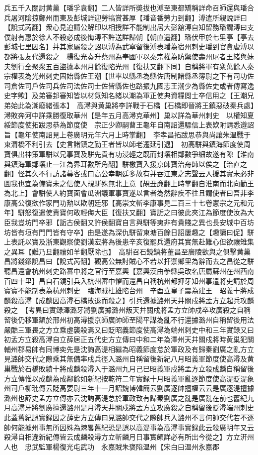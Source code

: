 兵五千入關討黄巢【璠孚袁翻】二人皆詳所奬拔也溥至東都矯稱詳命召師還與璠合兵屠河隂掠鄭州而東及彭城詳迎勞犒賞甚厚【璠音番勞力到翻】溥遣所親說詳曰【說式芮翻】衆心見迫請公解印以相授詳不能制出居大彭舘溥自知留務璠謂溥曰支僕射有惠於徐人不殺必成後悔溥不許送詳歸朝【朝直遥翻】璠伏甲於七里亭【亭去彭城七里因名】并其家屬殺之詔以溥為武寧留後溥表璠為宿州刺史璠到官貪虐溥以都將張友代還殺之　楊復光奏升蔡州為奉國軍以秦宗權為防禦使壽州屠者王緒與妹夫劉行全聚衆五百盜據本州月餘復陷光州【復扶又翻下同】自稱將軍有衆萬餘人秦宗權表為光州刺史固始縣佐王潮【世率以縣丞為縣佐唐制諸縣丞簿尉之下有司功佐司倉佐司戶佐司兵佐司法佐司士佐皆縣佐也路振九國志王潮少為縣佐史或者傳寫逸史字歟】及弟審邽審知皆以材氣知名緒以潮為軍正使典資糧閲士卒信用之【王潮兄弟始此為潮廢緒張本】　高潯與黄巢將李詳戰于石橋【石橋即晉將王鎮惡破秦兵處】潯敗奔河中詳乘勝復取華州【是年五月高潯克華州】巢以詳為華州刺史　以權知夏綏節度使拓跋思恭為節度使　宗正少卿嗣曹王龜年自南詔還驃信上表欵附請悉遵詔旨【龜年使南詔見上卷廣明元年六月上時掌翻】　李孝昌拓跋思恭與尚讓朱温戰于東渭橋不利引去【史言諸鎮之勤王者皆以師老遷延引退】　初高駢與鎮海節度使周寶俱出神策軍駢以兄事寶及駢先貴有功浸輕之既而封壤相鄰數爭細故遂有隙【淮南與鎮海軍鄰壤止一江為界耳數所角翻】駢檄寶入援京師寶治舟師以俟之【治直之翻】怪其久不行訪諸幕客或曰高公幸朝廷多故有并吞江東之志聲云入援其實未必非圖我也宜為備寶未之信使人覘駢殊無北上意【覘丑亷翻上時掌翻自淮南而北向勤王為北上】會駢使人約寶面會瓜洲議軍事寶遂以言者為然辭疾不往且謂使者曰吾非李康高公復欲作家門功勲以欺朝廷邪【高崇文斬李康事見二百三十七卷憲宗之元和元年】駢怒復遣使責寶何敢輕侮大臣【復扶又翻】寶詬之曰彼此夾江為節度使汝為大臣我豈坊門卒邪【詬古侯翻又許侯翻寶自言與駢等夷非有貴賤之異也長安城中百坊坊皆有垣有門門皆有守卒】由是遂為深仇駢留東塘百餘日詔屢趣之【趣讀曰促】駢上表託以寶及浙東觀察使劉漢宏將為後患辛亥復罷兵還府其實無赴難心但欲禳雉集之異耳【難乃旦翻禳如羊翻厭除也】　高駢召石鏡鎮將董昌至廣陵欲與之俱擊黄巢昌將錢鏐說昌曰【說式芮翻】觀高公無討賊心不若以扞禦鄉里為辭而去之昌從之駢聽昌還會杭州刺史路審中將之官行至嘉興【嘉興漢由拳縣吳改名唐屬蘇州在州西南百四十里】昌自石鏡引兵入杭州審中懼而還昌自稱杭州都押牙知州事遣將吏請於周寶寶不能制表為杭州刺史　臨海賊杜雄陷台州　辛酉立皇子震為建王　昭義十將成麟殺高潯【成麟因高潯石橋敗退而殺之】引兵還據潞州天井關戍將孟方立起兵攻麟殺之　【考異曰實録澤潞牙將劉廣據潞州叛天井關戍將孟方立帥戍卒攻廣殺之自稱留後仍移軍額於邢州初高潯援京師廣帥師至陽平謀為亂不行還據潞州自稱留後用法嚴酷三軍畏之方立乘虛襲殺焉又曰貶昭義節度使高潯為端州刺史中和三年實録又曰初孟方立殺高潯自立薛居正五代史方立傳曰中和二年為澤州天井關戍將時黄巢犯關輔州郡易帥有同博奕先是沈詢高湜相繼為昭義節度怠於軍政及有歸秦劉廣之亂方立見潞帥交代之際乘其無備率戍兵徑入潞州自稱留後新紀八月昭義軍節度使高潯及黄巢戰於石橋敗績十將成麟殺潯入于潞州九月己巳昭義軍戍將孟方立殺成麟自稱留後方立傳惟以成麟為成鄰餘如新紀按乾符二年實録十月昭義軍亂逐節度使高湜貶湜象州司戶柳玭傳云貶高要尉三年十一月詔魏博韓簡云劉廣逐帥擅權云云是廣逐湜擅據潞州也薛史孟方立傳亦云沈詢高湜怠於軍政致有歸秦劉廣之亂是廣亂在前也舊紀九月高潯牙將劉廣擅還潞州是月潯天井關戍將孟方立攻廣殺之自稱留後貶潯端州刺史此蓋舊紀誤實録因之薛史方立傳曰見潞帥交代之際帥兵入潞州不言何帥交代若不逐帥何能據州事無所因殊為踈畧舊紀恐是誤以高湜事為高潯事實録此云殺廣明年又云殺潯自相違新紀傳皆云成麟殺潯方立斬麟月日事實頗詳必有所出今從之】方立汧州人也　忠武監軍楊復光屯武功　永嘉賊朱褒陷温州【宋白曰温州永嘉郡
